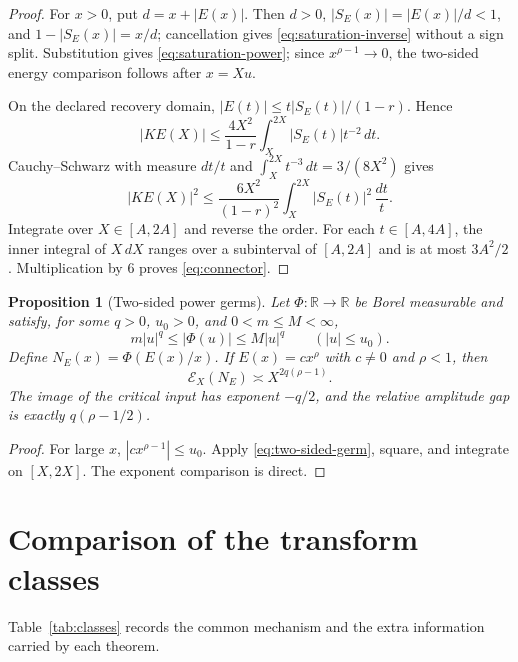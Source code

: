 \documentclass[11pt,a4paper]{amsart}
\newtheorem{proposition}[theorem]{Proposition}
\theoremstyle{definition}
\newcommand{\R}{\mathbb R}
\newcommand{\cE}{\mathcal E}
\begin{document}
\begin{proof}
For $x>0$, put $d=x+|E(x)|$.  Then $d>0$,
$|S_E(x)|=|E(x)|/d<1$, and $1-|S_E(x)|=x/d$; cancellation gives
\eqref{eq:saturation-inverse} without a sign split.  Substitution gives
\eqref{eq:saturation-power}; since $x^{\rho-1}\to0$, the two-sided energy
comparison follows after $x=Xu$.

On the declared recovery domain,
$|E(t)|\le t|S_E(t)|/(1-r)$.  Hence
\[
 |KE(X)|
 \le\frac{4X^2}{1-r}
 \int_X^{2X}|S_E(t)|t^{-2}\,dt.
\]
Cauchy--Schwarz with measure $dt/t$ and
$\int_X^{2X}t^{-3}\,dt=3/(8X^2)$ gives
\begin{equation}\label{eq:pointwise-connector}
 |KE(X)|^2
 \le\frac{6X^2}{(1-r)^2}
 \int_X^{2X}|S_E(t)|^2\,\frac{dt}{t}.
\end{equation}
Integrate over $X\in[A,2A]$ and reverse the order.  For each
$t\in[A,4A]$, the inner integral of $X\,dX$ ranges over a subinterval of
$[A,2A]$ and is at most $3A^2/2$.  Multiplication by $6$ proves \eqref{eq:connector}.
\end{proof}

\begin{proposition}[Two-sided power germs]\label{prop:germ}
Let $\Phi:\R\to\R$ be Borel measurable and satisfy, for some $q>0$, $u_0>0$, and $0<m\le M<\infty$,
\begin{equation}\label{eq:two-sided-germ}
  m|u|^q\le|\Phi(u)|\le M|u|^q
  \qquad(|u|\le u_0).
\end{equation}
Define $N_E(x)=\Phi(E(x)/x)$.  If $E(x)=cx^\rho$ with $c\ne0$ and $\rho<1$, then
\begin{equation}\label{eq:germ-energy}
 \cE_X(N_E)\asymp X^{2q(\rho-1)}.
\end{equation}
The image of the critical input has exponent $-q/2$, and the relative amplitude gap is exactly $q(\rho-1/2)$.
\end{proposition}

\begin{proof}
For large $x$, $|cx^{\rho-1}|\le u_0$.  Apply
\eqref{eq:two-sided-germ}, square, and integrate on $[X,2X]$.  The exponent comparison is direct.
\end{proof}

\section{Comparison of the transform classes}\label{sec:comparison}

Table~\ref{tab:classes} records the common mechanism and the extra information carried by each theorem.
\end{document}
